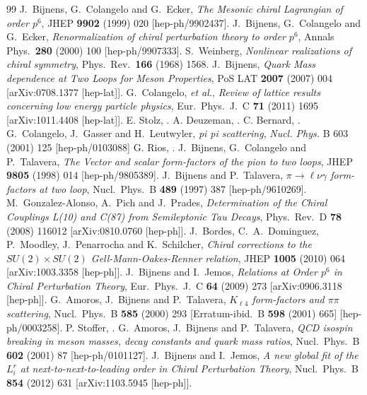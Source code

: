 \documentclass[cits,hyper]{PoS}
\begin{document}
\begin{thebibliography}{99}
  J.~Bijnens, G.~Colangelo and G.~Ecker,
  \emph{The Mesonic chiral Lagrangian of order $p^6$},
  JHEP {\bf 9902} (1999) 020
  [hep-ph/9902437].
 J.~Bijnens, G.~Colangelo and G.~Ecker,
  \emph{Renormalization of chiral perturbation theory to order $p^6$},
  Annals Phys.\  {\bf 280} (2000) 100
  [hep-ph/9907333].
  S.~Weinberg,
  \emph{Nonlinear realizations of chiral symmetry},
  Phys.\ Rev.\  {\bf 166} (1968) 1568.
  J.~Bijnens,
  \emph{Quark Mass dependence at Two Loops for Meson Properties},
  PoS LAT {\bf 2007} (2007) 004
  [arXiv:0708.1377 [hep-lat]].
  G.~Colangelo, {\it et al.},
  \emph{Review of lattice results concerning low energy particle physics},
  Eur.\ Phys.\ J.\ C {\bf 71} (2011) 1695
  [arXiv:1011.4408 [hep-lat]].
E. Stolz, .
A. Deuzeman, .
C. Bernard, .
G.~Colangelo, J.~Gasser and H.~Leutwyler,
\emph{pi pi scattering},
{\em Nucl. Phys.} B { 603} (2001) 125
[hep-ph/0103088]
G. Rios, .
  J.~Bijnens, G.~Colangelo and P.~Talavera,
  \emph{The Vector and scalar form-factors of the pion to two loops},
  JHEP {\bf 9805} (1998) 014
  [hep-ph/9805389].
 J.~Bijnens and P.~Talavera,
  \emph{$\pi\to\ell\nu\gamma$ form-factors at two loop},
  Nucl.\ Phys.\ B {\bf 489} (1997) 387
  [hep-ph/9610269].
  M.~Gonzalez-Alonso, A.~Pich and J.~Prades,
  \emph{Determination of the Chiral Couplings L(10) and C(87) from Semileptonic Tau Decays},
  Phys.\ Rev.\ D {\bf 78} (2008) 116012
  [arXiv:0810.0760 [hep-ph]].
  J.~Bordes, C.~A.~Dominguez, P.~Moodley, J.~Penarrocha and K.~Schilcher,
  \emph{Chiral corrections to the $SU(2)\times SU(2)$ Gell-Mann-Oakes-Renner relation},
  JHEP {\bf 1005} (2010) 064
  [arXiv:1003.3358 [hep-ph]].
  J.~Bijnens and I.~Jemos,
  \emph{Relations at Order $p^6$ in Chiral Perturbation Theory},
  Eur.\ Phys.\ J.\ C {\bf 64} (2009) 273
  [arXiv:0906.3118 [hep-ph]].
 G.~Amoros, J.~Bijnens and P.~Talavera,
  \emph{$K_{\ell4}$ form-factors and $\pi \pi$ scattering},
  Nucl.\ Phys.\ B {\bf 585} (2000) 293
   [Erratum-ibid.\ B {\bf 598} (2001) 665]
  [hep-ph/0003258].
P. Stoffer, .
  G.~Amoros, J.~Bijnens and P.~Talavera,
  \emph{QCD isospin breaking in meson masses, decay constants and quark mass ratios},
  Nucl.\ Phys.\ B {\bf 602} (2001) 87
  [hep-ph/0101127].
  J.~Bijnens and I.~Jemos,
  \emph{A new global fit of the $L^r_i$ at next-to-next-to-leading order in Chiral Perturbation Theory},
  Nucl.\ Phys.\ B {\bf 854} (2012) 631
  [arXiv:1103.5945 [hep-ph]].



\end{thebibliography}
\end{document}
